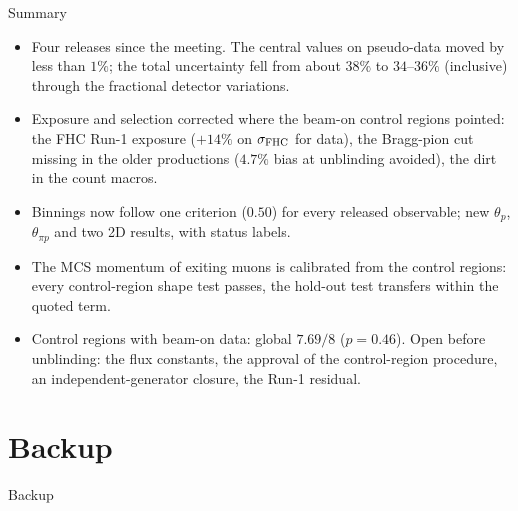 \documentclass[aspectratio=169,10pt]{beamer}
\newif\ifbackup
\begin{document}
\begin{frame}{Summary}
  \begin{itemize}\small\setlength\itemsep{4pt}
    \item Four releases since the meeting. The central values on pseudo-data moved by less than $1\%$; the total
          uncertainty fell from about $38\%$ to $34$--$36\%$ (inclusive) through the fractional detector variations.
    \item Exposure and selection corrected where the beam-on control regions pointed: the FHC Run-1 exposure
          ($+14\%$ on $\sigma_{\rm FHC}$ for data), the Bragg-pion cut missing in the older productions ($4.7\%$ bias at
          unblinding avoided), the dirt in the count macros.
    \item Binnings now follow one criterion ($0.50$) for every released observable; new $\theta_p$, $\theta_{\pi p}$ and
          two 2D results, with status labels.
    \item The MCS momentum of exiting muons is calibrated from the control regions: every control-region shape test
          passes, the hold-out test transfers within the quoted term.
    \item Control regions with beam-on data: global $7.69/8$ ($p=0.46$). Open before unblinding: the flux constants,
          the approval of the control-region procedure, an independent-generator closure, the Run-1 residual.
  \end{itemize}
  \label{mainend}
\end{frame}

\backuptrue
\appendix
\section*{Backup}

{
\begin{frame}[plain]
  \begin{center}\Huge\color{ubred} Backup\end{center}
\end{frame}}
\end{document}
